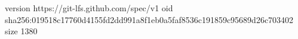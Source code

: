 version https://git-lfs.github.com/spec/v1
oid sha256:019518c17760d4155fd2dd991a8f1eb0a5faf8536c191859c95689d26c703402
size 1380

